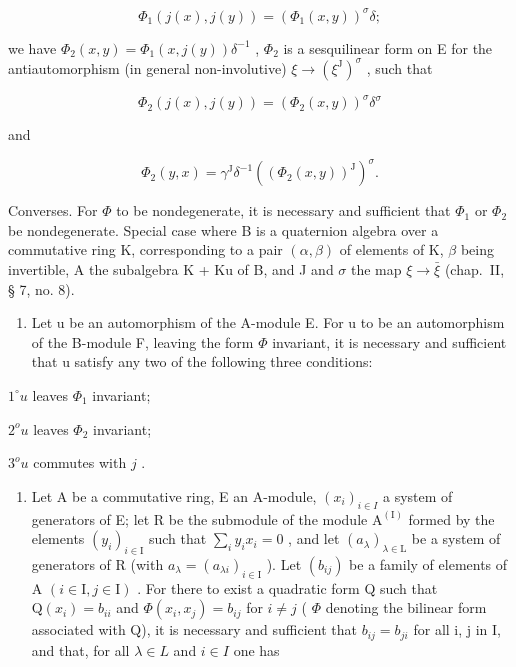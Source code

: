 \[
\Phi_ {1} (j (x), j (y)) = (\Phi_ {1} (x, y)) ^ {\sigma} \delta ;
\]

we have \(\Phi_{2}(x,y)=\Phi_{1}(x,j(y))\delta^{-1}\) , \(\Phi_{2}\) is a sesquilinear form on E for the antiautomorphism (in general non-involutive) \(\xi\to(\xi^{\mathrm{J}})^{\sigma}\) , such that

\[
\Phi_ {2} (j (x), j (y)) = (\Phi_ {2} (x, y)) ^ {\sigma} \delta^ {\sigma}
\]

and

\[
\Phi_ {2} (y, x) = \gamma^ {\mathrm{J}} \delta^ {- 1} ((\Phi_ {2} (x, y)) ^ {\mathrm{J}}) ^ {\sigma}.
\]

Converses. For \(\Phi\) to be nondegenerate, it is necessary and sufficient that \(\Phi_{1}\) or \(\Phi_{2}\) be nondegenerate. Special case where B is a quaternion algebra over a commutative ring K, corresponding to a pair \((\alpha, \beta)\) of elements of K, \(\beta\) being invertible, A the subalgebra K + Ku of B, and J and \(\sigma\) the map \(\xi \to \bar{\xi}\) (chap.~II, § 7, no. 8).

\begin{enumerate}
\def\labelenumi{\alph{enumi})}
\setcounter{enumi}{3}
\tightlist
\item
  Let u be an automorphism of the A-module E. For u to be an automorphism of the B-module F, leaving the form \(\Phi\) invariant, it is necessary and sufficient that u satisfy any two of the following three conditions:
\end{enumerate}

\(1^{\circ} u\) leaves \(\Phi_{1}\) invariant;

\(2^{o} u\) leaves \(\Phi_{2}\) invariant;

\(3^{o} u\) commutes with \(j\) .

\begin{enumerate}
\def\labelenumi{\arabic{enumi})}
\setcounter{enumi}{4}
\tightlist
\item
  Let A be a commutative ring, E an A-module, \((x_{i})_{i\in I}\) a system of generators of E; let R be the submodule of the module \(\mathrm{A}^{(\mathrm{I})}\) formed by the elements \((y_{i})_{i\in\mathrm{I}}\) such that \(\sum_{i}y_{i}x_{i}=0\) , and let \((a_{\lambda})_{\lambda\in\mathrm{L}}\) be a system of generators of R (with \(a_{\lambda}=(a_{\lambda i})_{i\in\mathrm{I}}\) ). Let \((b_{ij})\) be a family of elements of A \((i\in\mathrm{I},j\in\mathrm{I})\) . For there to exist a quadratic form Q such that \(\mathrm{Q}(x_{i})=b_{ii}\) and \(\Phi(x_{i},x_{j})=b_{ij}\) for \(i\neq j\) ( \(\Phi\) denoting the bilinear form associated with Q), it is necessary and sufficient that \(b_{ij}=b_{ji}\) for all i, j in I, and that, for all \(\lambda\in L\) and \(i\in I\) one has
\end{enumerate}

